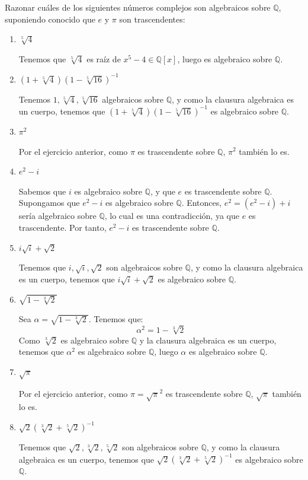 \begin{ejercicio}
    Razonar cuáles de los siguientes números complejos son algebraicos sobre $\mathbb{Q}$, suponiendo conocido que $e$ y $\pi$ son trascendentes:
    \begin{enumerate}
        \item $\sqrt[5]{4}$
        
        Tenemos que $\sqrt[5]{4}$ es raíz de $x^5-4\in \mathbb{Q}[x]$, luego es algebraico sobre $\mathbb{Q}$.
        \item $(1+\sqrt[5]{4})(1-\sqrt[5]{16})^{-1}$
        
        Tenemos $1,\sqrt[5]{4},\sqrt[5]{16}$ algebraicos sobre $\mathbb{Q}$, y como la clausura algebraica es un cuerpo, tenemos que $(1+\sqrt[5]{4})(1-\sqrt[5]{16})^{-1}$ es algebraico sobre $\mathbb{Q}$.
        \item $\pi^2$
        
        Por el ejercicio anterior, como $\pi$ es trascendente sobre $\mathbb{Q}$, $\pi^2$ también lo es.
        \item $e^2-i$
        
        Sabemos que $i$ es algebraico sobre $\mathbb{Q}$, y que $e$ es trascendente sobre $\mathbb{Q}$. Supongamos que $e^2-i$ es algebraico sobre $\mathbb{Q}$. Entonces, $e^2 = (e^2-i)+i$ sería algebraico sobre $\mathbb{Q}$, lo cual es una contradicción, ya que $e$ es trascendente. Por tanto, $e^2-i$ es trascendente sobre $\mathbb{Q}$.
        \item $i\sqrt{i} + \sqrt{2}$
        
        Tenemos que $i, \sqrt{i}, \sqrt{2}$ son algebraicos sobre $\mathbb{Q}$, y como la clausura algebraica es un cuerpo, tenemos que $i\sqrt{i} + \sqrt{2}$ es algebraico sobre $\mathbb{Q}$.
        \item $\sqrt{1-\sqrt[3]{2}}$
        
        Sea $\alpha = \sqrt{1-\sqrt[3]{2}}$. Tenemos que:
        \begin{equation*}
            \alpha^2 = 1-\sqrt[3]{2}
        \end{equation*}
        Como $\sqrt[3]{2}$ es algebraico sobre $\mathbb{Q}$ y la clausura algebraica es un cuerpo, tenemos que $\alpha^2$ es algebraico sobre $\mathbb{Q}$, luego $\alpha$ es algebraico sobre $\mathbb{Q}$.
        \item $\sqrt{\pi}$
        
        Por el ejercicio anterior, como $\pi=\sqrt{\pi}^2$ es trascendente sobre $\mathbb{Q}$, $\sqrt{\pi}$ también lo es.
        \item $\sqrt{2}(\sqrt[3]{2}+\sqrt[5]{2})^{-1}$
        
        Tenemos que $\sqrt{2}, \sqrt[3]{2}, \sqrt[5]{2}$ son algebraicos sobre $\mathbb{Q}$, y como la clausura algebraica es un cuerpo, tenemos que $\sqrt{2}(\sqrt[3]{2}+\sqrt[5]{2})^{-1}$ es algebraico sobre $\mathbb{Q}$.
    \end{enumerate}
\end{ejercicio}

